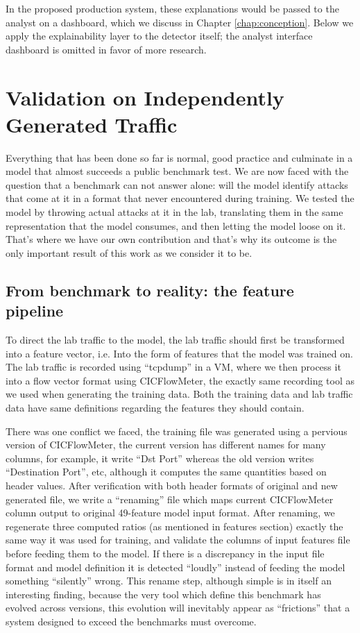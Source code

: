 In the proposed production system, these explanations would be passed to the analyst on a dashboard, which we discuss in Chapter \ref{chap:conception}. Below we apply the explainability layer to the detector itself; the analyst interface dashboard is omitted in favor of more research.

\section{Validation on Independently Generated Traffic}
\label{sec:results_validation}

Everything that has been done so far is normal, good practice and culminate in a model that almost succeeds a public benchmark test. We are now faced with the question that a benchmark can not answer alone: will the model identify attacks that come at it in a format that never encountered during training. We tested the model by throwing actual attacks at it in the lab, translating them in the same representation that the model consumes, and then letting the model loose on it. That's where we have our own contribution and that's why its outcome is the only important result of this work as we consider it to be.

\subsection{From benchmark to reality: the feature pipeline}
\label{sec:results_pipeline}

To direct the lab traffic to the model, the lab traffic should first be transformed into a feature vector, i.e. Into the form of features that the model was trained on. The lab traffic is recorded using “tcpdump” in a VM, where we then process it into a flow vector format using CICFlowMeter, the exactly same recording tool as we used when generating the training data. Both the training data and lab traffic data have same definitions regarding the features they should contain.
 
There was one conflict we faced, the training file was generated using a pervious version of CICFlowMeter, the current version has different names for many columns, for example, it write “Dst Port” whereas the old version writes “Destination Port”, etc, although it computes the same quantities based on header values. After verification with both header formats of original and new generated file, we write a “renaming” file which maps current CICFlowMeter column output to original 49-feature model input format. After renaming, we regenerate three computed ratios (as mentioned in features section) exactly the same way it was used for training, and validate the columns of input features file before feeding them to the model. If there is a discrepancy in the input file format and model definition it is detected “loudly” instead of feeding the model something “silently” wrong. This rename step, although simple is in itself an interesting finding, because the very tool which define this benchmark has evolved across versions, this evolution will inevitably appear as “frictions” that a system designed to exceed the benchmarks must overcome.

